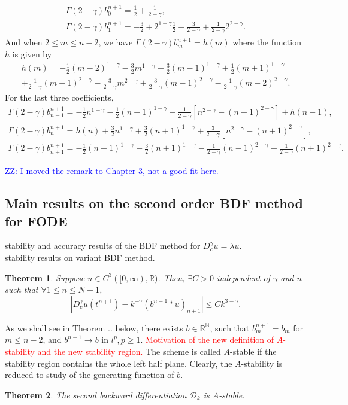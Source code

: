 \documentclass[11pt]{article} %
\newcommand{\tcr}[1]{\textcolor{red}{#1}}
\newcommand{\zz}[1]{\textcolor{blue}{ZZ: #1}}
\newtheorem{thm}{Theorem}
\begin{document}
\begin{gather}
\begin{array}{c}
\Gamma(2-\gamma)b_{0}^{n+1}=\frac{1}{2}+\frac{1}{2-\gamma},\\
\Gamma(2-\gamma)b_1^{n+1}=-\frac{3}{2}+2^{1-\gamma}\frac{1}{2}
-\frac{3}{2-\gamma}+\frac{1}{2-\gamma}2^{2-\gamma}.
 \end{array}
\end{gather}
And when $2\le m\le n-2$, we have $\Gamma(2-\gamma)b_{m}^{n+1}=h(m)$ where the function $h$ is given by
\begin{multline}
h(m)=-\frac{1}{2}(m-2)^{1-\gamma}-\frac{3}{2}m^{1-\gamma}+\frac{3}{2}(m-1)^{1-\gamma}+\frac{1}{2}(m+1)^{1-\gamma}\\
+\frac{1}{2-\gamma}(m+1)^{2-\gamma}
-\frac{3}{2-\gamma}m^{2-\gamma}
+\frac{3}{2-\gamma}(m-1)^{2-\gamma}
-\frac{1}{2-\gamma}(m-2)^{2-\gamma}.
\end{multline}
For the last three coefficients,
\begin{gather}
\Gamma(2-\gamma)b_{n-1}^{n+1}
=-\frac{1}{2}n^{1-\gamma}-\frac{1}{2}(n+1)^{1-\gamma}
-\frac{1}{2-\gamma}[n^{2-\gamma}-(n+1)^{2-\gamma}]
+h(n-1),\\
\Gamma(2-\gamma)b_n^{n+1}=h(n)+\frac{3}{2}n^{1-\gamma}+\frac{3}{2}(n+1)^{1-\gamma}
+\frac{3}{2-\gamma}[n^{2-\gamma}-(n+1)^{2-\gamma}],\\
\Gamma(2-\gamma)b_{n+1}^{n+1}
=-\frac{1}{2}(n-1)^{1-\gamma}-\frac{3}{2}(n+1)^{1-\gamma}
-\frac{1}{2-\gamma}(n-1)^{2-\gamma}+\frac{1}{2-\gamma}(n+1)^{2-\gamma}.
\end{gather}

\zz{I moved the remark to Chapter 3, not a good fit here.}


\subsection{Main results on the second order BDF method for FODE}
stability and accuracy results of the BDF method for $D^\gamma_c u = \lambda u$. \\
stability results on variant BDF method.

\begin{thm}
Suppose $u\in C^3([0,\infty), \mathbb{R})$. Then, $\exists C>0$ independent of $\gamma$ and $n$ such that $\forall 1\le  n\le N-1$, $$
|D_c^{\gamma}u(t^{n+1})-k^{-\gamma}(b^{n+1}*u)_{n+1}|\le Ck^{3-\gamma}.
$$
\end{thm}


As we shall see in Theorem .. below, there exists $b\in\mathbb{R}^{\mathbb{N}}$, such that $b^{n+1}_m=b_m$ for $m\le n-2$, and $b^{n+1}\to b$ in $l^p, p\ge 1$. \tcr{Motivation of the new definition of $A$-stability and the new stability region.}
The scheme is called $A$-stable if the stability region contains the whole left half plane. Clearly, the $A$-stability is reduced to study of the generating function of $b$.
\begin{thm}
The second backward differentiation $\mathcal{D}_k$ is $A$-stable. 
\end{thm}
\end{document}
